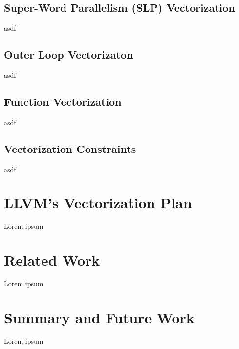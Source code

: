 \documentclass[sigplan,11pt,nonacm]{acmart}
\begin{document}
\subsection{Super-Word Parallelism (SLP) Vectorization}
asdf

\subsection{Outer Loop Vectorizaton}
asdf

\subsection{Function Vectorization}
asdf

\subsection{Vectorization Constraints}
asdf




\section{LLVM's Vectorization Plan}
\label{sec:vplan}
Lorem ipsum




\section{Related Work}
\label{sec:relatedwork}
Lorem ipsum




\section{Summary and Future Work}
\label{sec:summary}
Lorem ipsum




\end{document}
